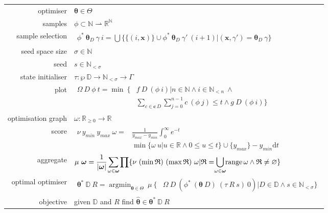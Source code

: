 \documentclass{article}
\DeclareMathOperator*{\argmin}{argmin}
\DeclareMathOperator*{\range}{range}
\begin{document}
\begin{tabularx}{\textwidth}{r X}
		optimiser & $\boldsymbol{\theta}\in\Theta$ \\
		samples & $\phi\subset\mathbb{N}\rightharpoonup\mathbb{R}^\mathbb{N}$ \\
		sample selection & $\begin{aligned}
			\phi^*\ \boldsymbol{\theta}_D\ \gamma\ i=\bigcup\{\{(i,\mathbf{x})\}\cup\phi^*\ \boldsymbol{\theta}_D\ \gamma'\ (i+1)|(\mathbf{x},\gamma')=\boldsymbol{\theta}_D\ \gamma\}
		\end{aligned}$ \\
		seed space size & $\sigma\in\mathbb{N}$ \\
		seed & $s\in\mathbb{N}_{<\sigma}$ \\
		state initialiser & $\tau:\wp\ \mathbb{D}\rightarrow\mathbb{N}_{<\sigma}\rightarrow\Gamma$ \\
		plot & $\begin{aligned}
			\Omega\ D\ \phi\ t=\min\ \{&f\ D\ (\phi\ i)|n\in\mathbb{N}\land i\in\mathbb{N}_{<n}\ \land \\
			&\sum_{c\in\mathbf{c}\,D}\sum_{j=0}^{n-1}c\ (\phi\ j)\leqslant t\land g\ D\ (\phi\ i)\}
		\end{aligned}$ \\
		optimisation graph & $\omega:\mathbb{R}_{\geqslant0}\rightarrow\mathbb{R}$ \\
		score & $\begin{aligned}
			\nu\ y_{min}\ y_{max}\ \omega=&\frac{1}{y_{max}-y_{min}}\int_0^\infty e^{-t}\\
			&\min\{\omega\ u|u\in\mathbb{R}\land0\leqslant u\leqslant t\}\cup\{y_{max}\}-y_{min}\mathrm{d}t
		\end{aligned}$ \\
		aggregate & $\begin{aligned}
			\mu\ \boldsymbol{\omega}=\frac{1}{|\boldsymbol{\omega}|}\smashoperator{\sum_{\omega\in\boldsymbol{\omega}}}\prod\{\nu\ (\min \mathfrak{R})\ (\max \mathfrak{R})\ \omega|\mathfrak{R}=\smashoperator{\bigcup_{\omega\in\boldsymbol{\omega}}}\range{\omega}\land \mathfrak{R}\not=\varnothing\}
		\end{aligned}$ \\
		optimal optimiser & $\begin{aligned}
			\boldsymbol{\theta}^*\ \mathbb{D}\ R=\argmin_{\boldsymbol{\theta}\in\Theta}\ \mu\ \{&\Omega\ D\ (\phi^*\ (\boldsymbol{\theta}\ D)\ (\tau\ R\ s)\ 0)|D\in\mathbb{D}\land s\in\mathbb{N}_{<\sigma}\}
		\end{aligned}$ \\
		objective & given $\mathbb{D}$ and $R$ find $\hat{\boldsymbol{\theta}}\in\boldsymbol{\theta}^*\ \mathbb{D}\ R$ \\
	\end{tabularx}
\end{document}
